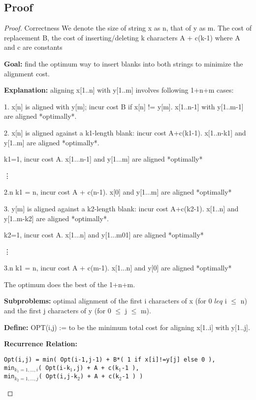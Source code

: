 \documentclass[openany]{article}
\begin{document}
\subsection*{Proof}
\begin{proof}{Correctness}
    We denote the size of string x as n, that of y as m. The cost of replacement B, the cost of inserting/deleting k characters A + c(k-1) where A and c are constants

    \textbf{Goal:} find the optimum way to insert blanks into both strings to minimize the alignment cost.
    
    \textbf{Explanation:} aligning x[1..n] with y[1..m] involves following 1+n+m cases:
    
    1. x[n] is aligned with y[m]; incur cost B if x[n] != y[m]. x[1..n-1] with y[1..m-1] are aligned *optimally*.
    
    2. x[n] is aligned against a k1-length blank: incur cost A+c(k1-1). x[1..n-k1] and y[1..m] are aligned *optimally*.
    
         k1=1, incur cost A. x[1...n-1] and y[1...m] are aligned *optimally*
        
        \qquad \vdots
        
        \qquad 2.n k1 = n, incur cost A + c(n-1). x[0] and y[1...m] are aligned *optimally*
    
3. y[m] is aligned against a k2-length blank: incur cost A+c(k2-1). x[1..n] and y[1..m-k2] are aligned *optimally*.

         k2=1, incur cost A. x[1...n] and y[1...m01] are aligned *optimally*
        
        \qquad \vdots
        
        \qquad 3.n k1 = n, incur cost A + c(m-1). x[1...n] and y[0] are aligned *optimally*

The optimum does the best of the 1+n+m.

    \textbf{Subproblems:} optimal alignment of the first i characters of x (for 0 $leq$ i $\leq$ n) and the first j characters of y (for 0 $\leq$ j $\leq$ m).
    
    \textbf{Define:} OPT(i,j) := to be the minimum total cost for aligning x[1..i] with y[1..j].
    
    \textbf{Recurrence Relation:} 
    \begin{center}
        \texttt{Opt(i,j) = min(  Opt(i-1,j-1) + B*( 1 if x[i]!=y[j] else 0 ),\\
        min$_{k_1=1,...,i}$( Opt(i-k$_1$,j) + A + c(k$_1$-1 ),\\
        min$_{k_2=1,...,j}$( Opt(i,j-k$_2$) + A + c(k$_2$-1 )  )}
    \end{center}
    

\end{proof}
\end{document}
